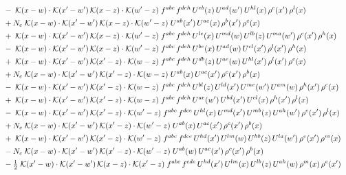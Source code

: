 \documentclass[9pt]{article}
\begin{document}
\begin{align}
&\quad -\;\mathcal{K}(x-w)\cdot\mathcal{K}(x'-w')\,\mathcal{K}(x-z)\cdot\mathcal{K}(w'-z)\;f^{abc}\,f^{deh}\,U^{eb}(z)\,U^{ad}(w')\,U^{hl}(x)\,\rho^{c}(x')\,\rho^{l}(x)\notag\\
&\quad +N_c\;\mathcal{K}(x-w)\cdot\mathcal{K}(x'-w')\,\mathcal{K}(x-z)\cdot\mathcal{K}(w'-z)\;U^{ab}(x')\,U^{ac}(x)\,\rho^{b}(x')\,\rho^{c}(x)\notag\\
&\quad +\;\mathcal{K}(x-w)\cdot\mathcal{K}(x'-w')\,\mathcal{K}(x-z)\cdot\mathcal{K}(w'-z)\;f^{abc}\,f^{deh}\,U^{le}(x)\,U^{md}(w)\,U^{lb}(z)\,U^{ma}(w')\,\rho^{c}(x')\,\rho^{h}(x)\notag\\
&\quad -\;\mathcal{K}(x-w)\cdot\mathcal{K}(x'-w')\,\mathcal{K}(x-z)\cdot\mathcal{K}(w'-z)\;f^{abc}\,f^{deh}\,U^{be}(x)\,U^{ad}(w)\,U^{cl}(x')\,\rho^{l}(x')\,\rho^{h}(x)\notag\\
&\quad +\;\mathcal{K}(x-w)\cdot\mathcal{K}(x'-w')\,\mathcal{K}(x'-z)\cdot\mathcal{K}(w-z)\;f^{abc}\,f^{deh}\,U^{db}(z)\,U^{ae}(w)\,U^{hl}(x')\,\rho^{l}(x')\,\rho^{c}(x)\notag\\
&\quad +N_c\;\mathcal{K}(x-w)\cdot\mathcal{K}(x'-w')\,\mathcal{K}(x'-z)\cdot\mathcal{K}(w-z)\;U^{ab}(x)\,U^{ac}(x')\,\rho^{c}(x')\,\rho^{b}(x)\notag\\
&\quad -\;\mathcal{K}(x-w)\cdot\mathcal{K}(x'-w')\,\mathcal{K}(x'-z)\cdot\mathcal{K}(w-z)\;f^{abc}\,f^{deh}\,U^{bl}(z)\,U^{ld}(x')\,U^{me}(w')\,U^{am}(w)\,\rho^{h}(x')\,\rho^{c}(x)\notag\\
&\quad +\;\mathcal{K}(x-w)\cdot\mathcal{K}(x'-w')\,\mathcal{K}(x'-z)\cdot\mathcal{K}(w-z)\;f^{abc}\,f^{deh}\,U^{ae}(w')\,U^{bd}(x')\,U^{cl}(x)\,\rho^{h}(x')\,\rho^{l}(x)\notag\\
&\quad -\;\mathcal{K}(x-w)\cdot\mathcal{K}(x'-w')\,\mathcal{K}(x'-z)\cdot\mathcal{K}(w'-z)\;f^{abc}\,f^{dce}\,U^{hl}(x)\,U^{md}(x')\,U^{mb}(z)\,U^{ah}(w')\,\rho^{e}(x')\,\rho^{l}(x)\notag\\
&\quad +N_c\;\mathcal{K}(x-w)\cdot\mathcal{K}(x'-w')\,\mathcal{K}(x'-z)\cdot\mathcal{K}(w'-z)\;U^{ab}(x)\,U^{ac}(x')\,\rho^{c}(x')\,\rho^{b}(x)\notag\\
&\quad +\;\mathcal{K}(x-w)\cdot\mathcal{K}(x'-w')\,\mathcal{K}(x'-z)\cdot\mathcal{K}(w'-z)\;f^{abc}\,f^{dce}\,U^{hd}(x')\,U^{lm}(w)\,U^{hb}(z)\,U^{la}(w')\,\rho^{e}(x')\,\rho^{m}(x)\notag\\
&\quad -N_c\;\mathcal{K}(x-w)\cdot\mathcal{K}(x'-w')\,\mathcal{K}(x'-z)\cdot\mathcal{K}(w'-z)\;U^{ab}(w)\,U^{ac}(x')\,\rho^{c}(x')\,\rho^{b}(x)\notag\\
&\quad -\tfrac{1}{2}\;\mathcal{K}(x'-w)\cdot\mathcal{K}(x'-w')\,\mathcal{K}(x-z)\cdot\mathcal{K}(x'-z)\;f^{abc}\,f^{cde}\,U^{hd}(x')\,U^{lm}(x)\,U^{lb}(z)\,U^{ah}(w)\,\rho^{m}(x)\,\rho^{e}(x')\notag\\

\end{align}
\end{document}
